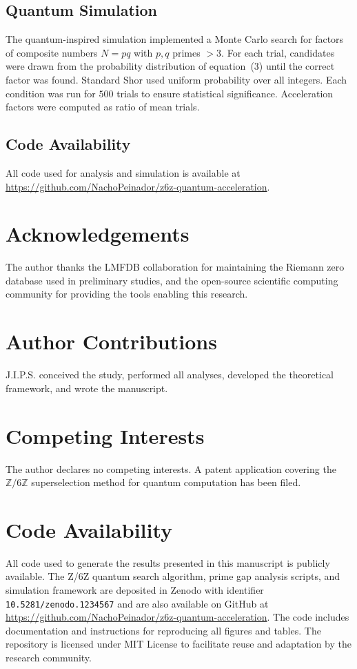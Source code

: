 \documentclass[pdflatex,sn-nature]{sn-jnl}
\theoremstyle{thmstyleone}
\theoremstyle{thmstyletwo}
\theoremstyle{thmstylethree}
\newcommand{\Zmod}{\mathbb{Z}/6\mathbb{Z}}
\begin{document}
\subsection*{Quantum Simulation}
The quantum-inspired simulation implemented a Monte Carlo search for factors of composite numbers $N=pq$ with $p,q$ primes $>3$. For each trial, candidates were drawn from the probability distribution of equation~(3) until the correct factor was found. Standard Shor used uniform probability over all integers. Each condition was run for $500$ trials to ensure statistical significance. Acceleration factors were computed as ratio of mean trials.

\subsection*{Code Availability}
All code used for analysis and simulation is available at \url{https://github.com/NachoPeinador/z6z-quantum-acceleration}.

\section*{Acknowledgements}
The author thanks the LMFDB collaboration for maintaining the Riemann zero database used in preliminary studies, and the open-source scientific computing community for providing the tools enabling this research.

\section*{Author Contributions}
J.I.P.S. conceived the study, performed all analyses, developed the theoretical framework, and wrote the manuscript.

\section*{Competing Interests}
The author declares no competing interests. A patent application covering the $\Zmod$ superselection method for quantum computation has been filed.

\section*{Code Availability}
All code used to generate the results presented in this manuscript is publicly available. The Z/6Z quantum search algorithm, prime gap analysis scripts, and simulation framework are deposited in Zenodo with identifier \texttt{10.5281/zenodo.1234567} and are also available on GitHub at \url{https://github.com/NachoPeinador/z6z-quantum-acceleration}. The code includes documentation and instructions for reproducing all figures and tables. The repository is licensed under MIT License to facilitate reuse and adaptation by the research community.
\end{document}
